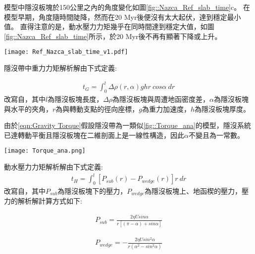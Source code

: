 模型中隱沒板塊於150公里之內的角度變化如圖\ref{fig::Nazca_Ref_slab_time}c。
在模型早期，角度隨時間陡降，然而在20 Myr後便沒有太大起伏，達到穩定最小值。
直得注意的是，動水壓力力矩幾乎在同時間達到穩定大值，如圖\ref{fig::Nazca_Ref_slab_time}所示，於20 Myr後不再有顯著下降或上升。

\begin{figure*}[h]
    \centering
    \texttt{[image: Ref\_Nazca\_slab\_time\_v1.pdf]}
    \caption[納茲卡參考模型隱沒板塊狀態隨時間變化]{納茲卡參考模型隱沒板塊狀態隨時間變化。}
    \label{fig::Nazca_Ref_slab_time}
\end{figure*}

\newpage
隱沒帶中重力力矩解析解由下式定義:

\begin{align}
    t_G=\int^l_0 \Delta\rho(r,\alpha)ghr\ cos\alpha\ dr
    \label{eqn:Gravity Torque}
\end{align}
改寫自\citealp{stevenson1977angle}，其中$l$為隱沒板塊長度，$\Delta\rho$為隱沒板塊與周遭地函密度差，$\alpha$為隱沒板塊與水平的夾角，$r$為與轉動支點的徑向座標，$g$為重力加速度，$h$為隱沒板塊厚度。

由於\ref{eqn:Gravity Torque}假設隱沒帶為一類似\ref{fig::Torque_ana}的模型，隱沒系統已達轉動平衡且隱沒板塊在二維剖面上是一線性構造，因此$\alpha$不變且為一常數。

\begin{figure*}[hb]
    \centering
    \texttt{[image: Torque\_ana.png]}
    \caption[簡易隱沒帶二為剖面示意圖]{簡易隱沒帶二為剖面示意圖。摘自\citealp{stevenson1977angle}。}
    \label{fig::Torque_ana}
\end{figure*}

動水壓力力矩解析解由下式定義:
\begin{align}
    t_H=\int^l_0 [P_{sub}(r)-P_{wedge}(r)]r\ dr
    \label{eqn:Hydrodynamic Torque}
\end{align}
改寫自\citealp{McKenzie1969}，其中$P_{sub}$為隱沒板塊下的壓力，$P_{wedge}$為隱沒板塊上、地函楔的壓力，壓力的解析解計算方式如下:

\begin{align}
    P_{sub}=\frac{2 \eta U sin \alpha}{r[(\pi - \alpha)+sin\alpha]}
    \label{eqn:Psub}
\end{align}

\begin{align}
    P_{wedge}=-\frac{2 \eta U sin^{2} \alpha}{r(\alpha^2-sin^2\alpha)}
    \label{eqn:Pwedge}
\end{align}

